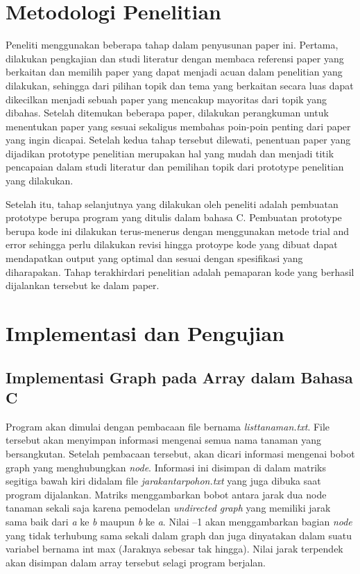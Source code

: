 \documentclass[conference]{IEEEtran}
\begin{document}
\section{Metodologi Penelitian}
Peneliti menggunakan beberapa tahap dalam penyusunan paper ini. Pertama, dilakukan pengkajian dan studi literatur dengan membaca referensi paper yang berkaitan dan memilih paper yang dapat menjadi acuan dalam penelitian yang dilakukan, sehingga dari pilihan topik dan tema yang berkaitan secara luas dapat dikecilkan menjadi sebuah paper yang mencakup mayoritas dari topik yang dibahas. Setelah ditemukan beberapa paper, dilakukan perangkuman untuk menentukan paper yang sesuai sekaligus membahas poin-poin penting dari paper yang ingin dicapai. Setelah kedua tahap tersebut dilewati, penentuan paper yang dijadikan prototype penelitian merupakan hal yang mudah dan menjadi titik pencapaian dalam studi literatur dan pemilihan topik dari prototype penelitian yang dilakukan.

Setelah itu, tahap selanjutnya yang dilakukan oleh peneliti adalah pembuatan prototype berupa program yang ditulis dalam bahasa C. Pembuatan prototype berupa kode ini dilakukan terus-menerus dengan menggunakan metode trial and error sehingga perlu dilakukan revisi hingga protoype kode yang dibuat dapat mendapatkan output yang optimal dan sesuai dengan spesiﬁkasi yang diharapakan. Tahap terakhirdari penelitian adalah pemaparan kode yang berhasil dijalankan tersebut ke dalam paper.

\section{Implementasi dan Pengujian}
\subsection{Implementasi Graph pada Array dalam Bahasa C}
Program akan dimulai dengan pembacaan ﬁle bernama \textit{listtanaman.txt}. File tersebut akan menyimpan informasi mengenai semua nama tanaman yang bersangkutan. Setelah pembacaan tersebut, akan dicari informasi mengenai bobot graph yang menghubungkan \textit{node}. Informasi ini disimpan di dalam matriks segitiga bawah kiri didalam ﬁle \textit{jarakantarpohon.txt} yang juga dibuka saat program dijalankan. Matriks menggambarkan bobot antara jarak dua node tanaman sekali saja karena pemodelan \textit{undirected graph} yang memiliki jarak sama baik dari \textit{a} ke \textit{b} maupun \textit{b} ke \textit{a}. Nilai --1 akan menggambarkan bagian \textit{node} yang tidak terhubung sama sekali dalam graph dan juga dinyatakan dalam suatu variabel bernama int max (Jaraknya sebesar tak hingga). Nilai jarak terpendek akan disimpan dalam array tersebut selagi program berjalan. 
\end{document}
